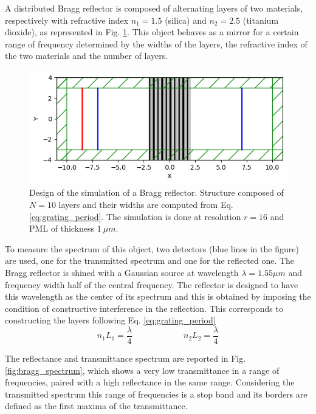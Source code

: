 A distributed Bragg reflector is composed of alternating layers of two materials, respectively with refractive index \(n_1 = 1.5\) (silica) and \(n_2 = 2.5\) (titanium dioxide), as represented in Fig. \ref{fig:bragg_design}. This object behaves as a mirror for a certain range of frequency determined by the widths of the layers, the refractive index of the two materials and the number of layers.

\begin{figure}[H]
    \centering
    \includegraphics[width=0.8\linewidth]{Figures/bragg_design.png}
    \caption{Design of the simulation of a Bragg reflector. Structure composed of \(N=10\) layers and their widths are computed from Eq. \ref{eq:grating_period}. The simulation is done at resolution \(r=16\) and PML of thickness \(1\ \mu m\).}
    \label{fig:bragg_design}
\end{figure}

To measure the spectrum of this object, two detectors (blue lines in the figure) are used, one for the transmitted spectrum and one for the reflected one. The Bragg reflector is shined with a Gaussian source at wavelength \(\lambda = 1.55 \mu m\) and frequency width half of the central frequency. The reflector is designed to have this wavelength as the center of its spectrum and this is obtained by imposing the condition of constructive interference in the reflection. This corresponds to constructing the layers following Eq. \ref{eq:grating_period}  
\begin{equation}\label{eq:grating_period}
    n_1 L_1 = \frac{\lambda}{4} \qquad\qquad\qquad n_2 L_2 = \frac{\lambda}{4}
\end{equation}

The reflectance and transmittance spectrum are reported in Fig. \ref{fig:bragg_spectrum}, which shows a very low transmittance in a range of frequencies, paired with a high reflectance in the same range. Considering the transmitted spectrum this range of frequencies is a stop band and its borders are defined as the first maxima of the transmittance.

